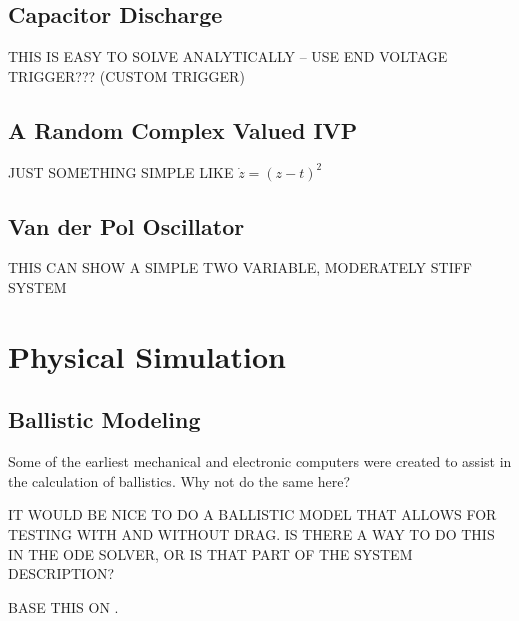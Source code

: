 \documentclass[letterpaper,10pt]{book}
\begin{document}
    \section{Capacitor Discharge}
      THIS IS EASY TO SOLVE ANALYTICALLY -- USE END VOLTAGE TRIGGER??? (CUSTOM TRIGGER)

    \section{A Random Complex Valued IVP}
      JUST SOMETHING SIMPLE LIKE $\dot{z} = (z - t)^{2}$

    \section{Van der Pol Oscillator}
      THIS CAN SHOW A SIMPLE TWO VARIABLE, MODERATELY STIFF SYSTEM

  \chapter{Physical Simulation}
    \section{Ballistic Modeling}
      Some of the earliest mechanical and electronic computers were created to assist in the calculation of ballistics.  Why not do the same here?
      
      IT WOULD BE NICE TO DO A BALLISTIC MODEL THAT ALLOWS FOR TESTING WITH AND WITHOUT DRAG.  IS THERE A WAY TO DO THIS IN THE ODE SOLVER, OR IS THAT PART OF THE SYSTEM DESCRIPTION?
      
      BASE THIS ON \cite{wade2011going}.
\end{document}
